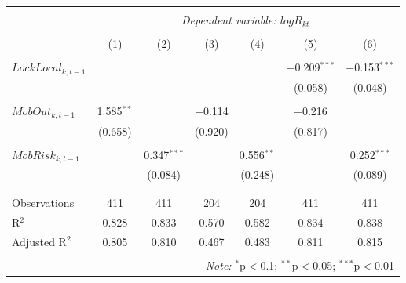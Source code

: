 \small 
\begin{tabular}{@{\extracolsep{5pt}}lcccccc} 
\\[-1.8ex]\hline 
\hline \\[-1.8ex] 
 & \multicolumn{6}{c}{\textit{Dependent variable: $log R_{kt}$}} \\ 
\cline{2-7} 
\\[-1.8ex] & (1) & (2) & (3) & (4) & (5) & (6)\\ 
\hline \\[-1.8ex] 
 $LockLocal_{k,t-1}$ &  &  &  &  & $-$0.209$^{***}$ & $-$0.153$^{***}$ \\ 
  &  &  &  &  & (0.058) & (0.048) \\ 
  & & & & & & \\ 
 $MobOut_{k,t-1}$ & 1.585$^{**}$ &  & $-$0.114 &  & $-$0.216 &  \\ 
  & (0.658) &  & (0.920) &  & (0.817) &  \\ 
  & & & & & & \\ 
 $MobRisk_{k,t-1}$ &  & 0.347$^{***}$ &  & 0.556$^{**}$ &  & 0.252$^{***}$ \\ 
  &  & (0.084) &  & (0.248) &  & (0.089) \\ 
  & & & & & & \\ 
\hline \\[-1.8ex] 
Observations & 411 & 411 & 204 & 204 & 411 & 411 \\ 
R$^{2}$ & 0.828 & 0.833 & 0.570 & 0.582 & 0.834 & 0.838 \\ 
Adjusted R$^{2}$ & 0.805 & 0.810 & 0.467 & 0.483 & 0.811 & 0.815 \\ 
\hline 
\hline \\[-1.8ex] 
  & \multicolumn{6}{r}{\textit{Note:} $^{*}$p$<$0.1; $^{**}$p$<$0.05; $^{***}$p$<$0.01} \\ 
\end{tabular} 